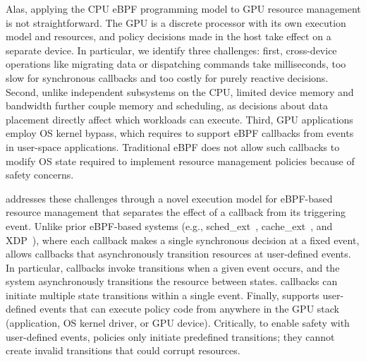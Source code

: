 Alas, applying the CPU eBPF programming model to GPU resource management is not straightforward.
The GPU is a discrete processor with its own execution model and resources, and policy decisions made in the host take effect on a separate device.
In particular, we identify three challenges: first, cross-device operations like migrating data or dispatching commands take milliseconds, too slow for synchronous callbacks and too costly for purely reactive decisions.
Second, unlike independent subsystems on the CPU, limited device memory and bandwidth further couple memory and scheduling, as decisions about data placement directly affect which workloads can execute.
Third, GPU applications employ OS kernel bypass, which requires \sys{} to support eBPF callbacks from events in user-space applications.
Traditional eBPF does not allow such callbacks to modify OS state required to implement resource management policies because of safety concerns.

\sys{} addresses these challenges through a novel execution model for eBPF-based resource management that separates the effect of a callback from its triggering event.
Unlike prior eBPF-based systems (e.g., sched\_ext~\cite{schedext-docs}, cache\_ext~\cite{zussman2025cache_ext}, and XDP~\cite{hoiland2018xdp}), where each callback makes a single synchronous decision at a fixed event, \sys{} allows callbacks that asynchronously transition resources at user-defined events.
In particular, \sys callbacks invoke transitions when a given event occurs, and the system asynchronously transitions the resource between states.
\sys{} callbacks can initiate multiple state transitions within a single event.
Finally, \sys{} supports user-defined events that can execute policy code from anywhere in the GPU stack (application, OS kernel driver, or GPU device).
Critically, to enable safety with user-defined events, \sys{} policies only initiate predefined transitions; they cannot create invalid transitions that could corrupt resources.

